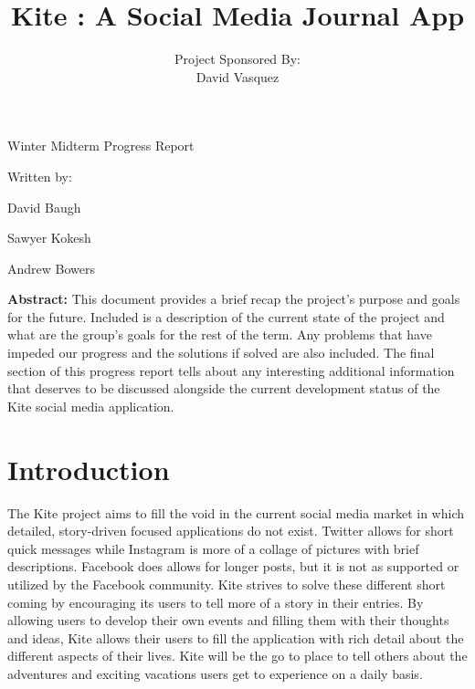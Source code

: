 \documentclass[compsoc, 10, draftclsnofoot, onecolumn]{IEEEtran}
\date{}
\title{Kite : A Social Media Journal App}
\author{ %
	Project Sponsored By: \\
    David Vasquez
}
\begin{document}
\null  %
\nointerlineskip  %
\vfill
\let\snewpage \newpage
\let\newpage \relax
\maketitle
\begin{center}
\huge{Winter Midterm Progress Report}\par
\vspace{2mm}
\large{Written by:}\par
\normalsize{David Baugh}\par
\normalsize{Sawyer Kokesh}\par
\normalsize{Andrew Bowers}\par
\vspace{8mm}
\large{\textbf{Abstract:} This document provides a brief recap the project's purpose and goals for the future. Included is a description of the current state of the project and what are the group's goals for the rest of the term. Any problems that have impeded our progress and the solutions if solved are also included. The final section of this progress report tells about any interesting additional information that deserves to be discussed alongside the current development status of the Kite social media application.}\par 
\vspace{2mm}
\end{center}
\let \newpage \snewpage
\vfill 
\break %

\tableofcontents
\clearpage

\section{Introduction}
The Kite project aims to fill the void in the current social media market in which detailed, story-driven focused applications do not exist. Twitter allows for short quick messages while Instagram is more of a collage of pictures with brief descriptions. Facebook does allows for longer posts, but it is not as supported or utilized by the Facebook community. Kite strives to solve these different short coming by encouraging its users to tell more of a story in their entries. By allowing users to develop their own events and filling them with their thoughts and ideas, Kite allows their users to fill the application with rich detail about the different aspects of their lives. Kite will be the go to place to tell others about the adventures and exciting vacations users get to experience on a daily basis.
\end{document}
